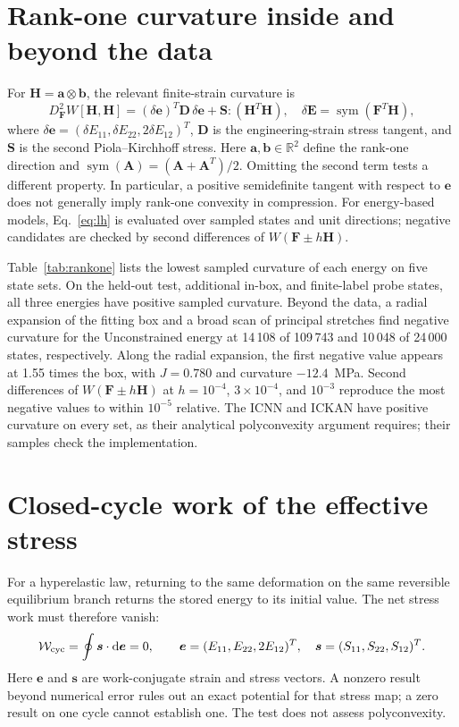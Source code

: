 \documentclass[10pt,a4paper]{article}
\newcommand{\F}{\bm F}
\newcommand{\E}{\bm E}
\newcommand{\Sg}{\bm S}
\newcommand{\ee}{\bm e}
\newcommand{\ssv}{\bm s}
\newcommand{\dd}{\mathrm d}
\newcommand{\R}{\mathbb R}
\begin{document}
\FloatBarrier
\section{Rank-one curvature inside and beyond the data}
For $\bm H=\bm a\otimes\bm b$, the relevant finite-strain curvature is
\begin{equation}
 D^2_{\F}W[\bm H,\bm H]
   =(\delta\ee)^T\bm D\,\delta\ee+\Sg:(\bm H^T\bm H),\quad
 \delta\E=\operatorname{sym}(\F^T\bm H),
 \label{eq:lh}
\end{equation}
where $\delta\ee=(\delta E_{11},\delta E_{22},2\delta E_{12})^T$, $\bm D$ is the engineering-strain stress tangent, and $\Sg$ is the second Piola--Kirchhoff stress. Here $\bm a,\bm b\in\R^2$ define the rank-one direction and $\operatorname{sym}(\bm A)=(\bm A+\bm A^T)/2$. Omitting the second term tests a different property. In particular, a positive semidefinite tangent with respect to $\ee$ does not generally imply rank-one convexity in compression. For energy-based models, Eq.~\eqref{eq:lh} is evaluated over sampled states and unit directions; negative candidates are checked by second differences of $W(\F\pm h\bm H)$.

\begin{table}[htbp]
 \centering\small
 \caption{Lowest sampled rank-one curvature inside and beyond the data.}
 \label{tab:rankone}
 
\end{table}

Table~\ref{tab:rankone} lists the lowest sampled curvature of each energy on five state sets. On the held-out test, additional in-box, and finite-label probe states, all three energies have positive sampled curvature. Beyond the data, a radial expansion of the fitting box and a broad scan of principal stretches find negative curvature for the Unconstrained energy at 14\,108 of 109\,743 and 10\,048 of 24\,000 states, respectively. Along the radial expansion, the first negative value appears at 1.55 times the box, with $J=0.780$ and curvature $-12.4$~MPa. Second differences of $W(\F\pm h\bm H)$ at $h=10^{-4}$, $3\times10^{-4}$, and $10^{-3}$ reproduce the most negative values to within $10^{-5}$ relative. The ICNN and ICKAN have positive curvature on every set, as their analytical polyconvexity argument requires; their samples check the implementation.


\FloatBarrier
\section{Closed-cycle work of the effective stress}
\label{sec:cycle}
For a hyperelastic law, returning to the same deformation on the same reversible equilibrium branch returns the stored energy to its initial value. The net stress work must therefore vanish:
\begin{equation}
 \mathcal W_{\rm cyc}=\oint\ssv\cdot\dd\ee=0,
 \qquad
 \ee=(E_{11},E_{22},2E_{12})^T,\quad
 \ssv=(S_{11},S_{22},S_{12})^T.
\end{equation}
Here $\ee$ and $\ssv$ are work-conjugate strain and stress vectors. A nonzero result beyond numerical error rules out an exact potential for that stress map; a zero result on one cycle cannot establish one. The test does not assess polyconvexity.
\end{document}
